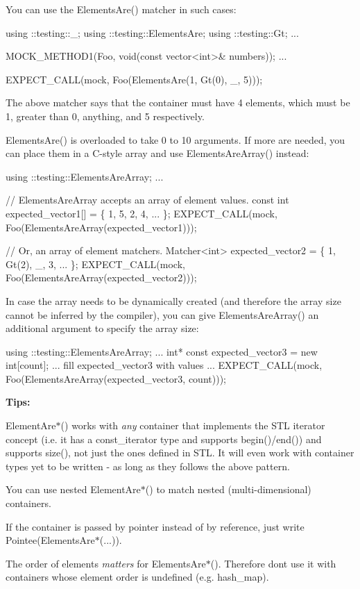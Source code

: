 You can use the {\ttfamily Elements\+Are()} matcher in such cases\+:


\begin{DoxyCode}
using ::testing::\_;
using ::testing::ElementsAre;
using ::testing::Gt;
...

  MOCK\_METHOD1(Foo, void(const vector<int>& numbers));
...

  EXPECT\_CALL(mock, Foo(ElementsAre(1, Gt(0), \_, 5)));
\end{DoxyCode}


The above matcher says that the container must have 4 elements, which must be 1, greater than 0, anything, and 5 respectively.

{\ttfamily Elements\+Are()} is overloaded to take 0 to 10 arguments. If more are needed, you can place them in a C-\/style array and use {\ttfamily Elements\+Are\+Array()} instead\+:


\begin{DoxyCode}
using ::testing::ElementsAreArray;
...

  // ElementsAreArray accepts an array of element values.
  const int expected\_vector1[] = \{ 1, 5, 2, 4, ... \};
  EXPECT\_CALL(mock, Foo(ElementsAreArray(expected\_vector1)));

  // Or, an array of element matchers.
  Matcher<int> expected\_vector2 = \{ 1, Gt(2), \_, 3, ... \};
  EXPECT\_CALL(mock, Foo(ElementsAreArray(expected\_vector2)));
\end{DoxyCode}


In case the array needs to be dynamically created (and therefore the array size cannot be inferred by the compiler), you can give {\ttfamily Elements\+Are\+Array()} an additional argument to specify the array size\+:


\begin{DoxyCode}
using ::testing::ElementsAreArray;
...
  int* const expected\_vector3 = new int[count];
  ... fill expected\_vector3 with values ...
  EXPECT\_CALL(mock, Foo(ElementsAreArray(expected\_vector3, count)));
\end{DoxyCode}


{\bfseries Tips\+:}


\begin{DoxyItemize}
\item {\ttfamily Element\+Are$\ast$()} works with {\itshape any} container that implements the S\+TL iterator concept (i.\+e. it has a {\ttfamily const\+\_\+iterator} type and supports {\ttfamily begin()/end()}) and supports {\ttfamily size()}, not just the ones defined in S\+TL. It will even work with container types yet to be written -\/ as long as they follows the above pattern.
\item You can use nested {\ttfamily Element\+Are$\ast$()} to match nested (multi-\/dimensional) containers.
\item If the container is passed by pointer instead of by reference, just write {\ttfamily Pointee(Elements\+Are$\ast$(...))}.
\item The order of elements {\itshape matters} for {\ttfamily Elements\+Are$\ast$()}. Therefore don\textquotesingle{}t use it with containers whose element order is undefined (e.\+g. {\ttfamily hash\+\_\+map}).
\end{DoxyItemize}

